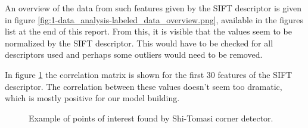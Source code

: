 An overview of the data from such features given by the SIFT descriptor is given in figure \ref{fig:1-data_analysis-labeled_data_overview.png}, available in the figures list at the end of this report.
From this, it is visible that the values seem to be normalized by the SIFT descriptor.
This would have to be checked for all descriptors used and perhaps some outliers would need to be removed.

In figure \ref{fig:1-data_analysis-correlation_matrix} the correlation matrix is shown for the first 30 features of the SIFT descriptor.
The correlation between these values doesn't seem too dramatic, which is mostly positive for our model building.

\begin{figure}[H]
    \centering
    \captionsetup{width=0.7\linewidth}
    \captionsetup{justification=centering}
    \caption{Example of points of interest found by Shi-Tomasi corner detector.}
    \label{fig:1-data_analysis-correlation_matrix}
\end{figure}